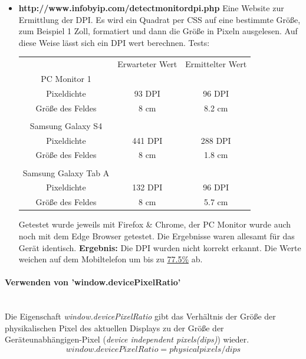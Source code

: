 \begin{itemize}
	\item
	      \textbf{http://www.infobyip.com/detectmonitordpi.php} Eine Website zur Ermittlung der DPI. Es wird ein Quadrat per CSS auf eine bestimmte Größe, zum Beispiel 1 Zoll, formatiert und dann die Größe in Pixeln ausgelesen. Auf diese Weise lässt sich ein DPI wert berechnen.
	      \newline
	      Tests:
	      \begin{enumerate}
	      	\begin{tabular}{ccc}
	      		                     & Erwarteter Wert & Ermittelter Wert           \\
	      		PC Monitor 1         &                 &                            \\
	      		Pixeldichte          & 93 DPI          & \colorbox{red!30}{96 DPI}  \\
	      		Größe des Feldes   & 8 cm            & \colorbox{red!30}{8.2 cm}  \\
	      		                     &                 &                            \\
	      		Samsung Galaxy S4    &                 &                            \\
	      		Pixeldichte          & 441 DPI         & \colorbox{red!30}{288 DPI} \\
	      		Größe des Feldes   & 8 cm            & \colorbox{red!30}{1.8 cm}  \\
	      		                     &                 &                            \\
	      		Samsung Galaxy Tab A &                 &                            \\
	      		Pixeldichte          & 132 DPI         & \colorbox{red!30}{96 DPI}  \\
	      		Größe des Feldes   & 8 cm            & \colorbox{red!30}{5.7 cm}  \\
	      	\end{tabular}
	      \end{enumerate}
	      Getestet wurde jeweils mit Firefox & Chrome, der PC Monitor wurde auch noch mit dem Edge Browser getestet. Die Ergebnisse waren allesamt für das Gerät identisch.
	      \newline
	      \textbf{Ergebnis:} Die DPI wurden nicht korrekt erkannt. Die Werte weichen auf dem Mobiltelefon um bis zu \underline{77.5\%} ab.
\end{itemize}
\newpage
\paragraph{Verwenden von 'window.devicePixelRatio'}
\mbox{}\\
Die Eigenschaft \textit{window.devicePixelRatio} gibt das Verhältnis der Größe der physikalischen Pixel des aktuellen Displays zu der Größe der Geräteunabhängigen-Pixel (\textit{device independent pixels(dips)}) wieder.
\begin{displaymath}
	window.devicePixelRatio = physical pixels / dips 
\end{displaymath}

